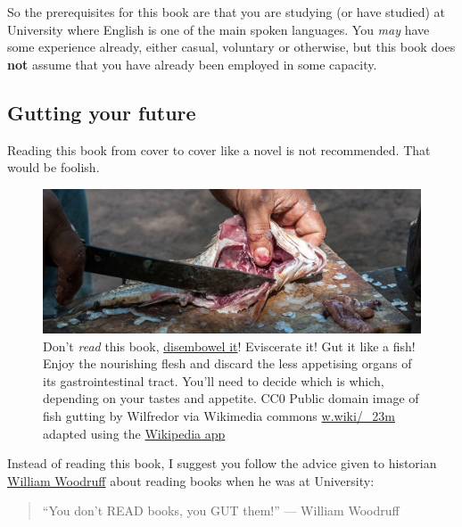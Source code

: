 \documentclass[
]{book}
\begin{document}
So the prerequisites for this book are that you are studying (or have studied) at University where English is one of the main spoken languages. You \emph{may} have some experience already, either casual, voluntary or otherwise, but this book does \textbf{not} assume that you have already been employed in some capacity.

\hypertarget{gut}{%
\subsection{Gutting your future}\label{gut}}

Reading this book from cover to cover like a novel is not recommended. That would be foolish.

\begin{figure}

{\centering \includegraphics[width=1\linewidth]{images/fish-gutting} 

}

\caption{Don't \emph{read} this book, \href{https://en.wikipedia.org/wiki/Disembowelment}{disembowel it}! Eviscerate it! Gut it like a fish! Enjoy the nourishing flesh and discard the less appetising organs of its gastrointestinal tract. You'll need to decide which is which, depending on your tastes and appetite. CC0 Public domain image of fish gutting by Wilfredor via Wikimedia commons \href{https://w.wiki/_23m}{w.wiki/\_23m} adapted using the \href{https://apps.apple.com/gb/app/wikipedia/id324715238}{Wikipedia app}}\label{fig:gut-fig}
\end{figure}



Instead of reading this book, I suggest you follow the advice given to historian \href{https://en.wikipedia.org/wiki/William_Woodruff}{William Woodruff} about reading books when he was at University:

\begin{quote}
``You don't READ books, you GUT them!''
\hfill --- William Woodruff \citep{nabend}
\end{quote}
\end{document}

